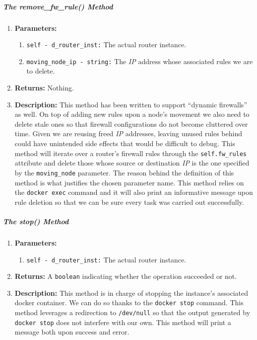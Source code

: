         \subparagraph{The remove\_fw\_rule() Method}
            \begin{enumerate}
                \item \textbf{Parameters:}
                \begin{enumerate}
                    \item \texttt{self - d\_router\_inst:} The actual router instance.
                    \item \texttt{moving\_node\_ip - string:} The \textit{IP} address whose associated rules we are to delete.
                \end{enumerate}
                \item \textbf{Returns:} Nothing.
                \item \textbf{Description:} This method has been written to support ``dynamic firewalls'' as well. On top of adding new rules upon a node's movement we also need to delete stale ones so that firewall configurations do not become cluttered over time. Given we are reusing freed \textit{IP} addresses, leaving unused rules behind could have unintended side effects that would be difficult to debug. This method will iterate over a router's firewall rules through the \texttt{self.fw\_rules} attribute and delete those whose source or destination \textit{IP} is the one specified by the \texttt{moving\_node} parameter. The reason behind the definition of this method is what justifies the chosen parameter name. This method relies on the \texttt{docker exec} command and it will also print an informative message upon rule deletion so that we can be sure every task was carried out successfully.
            \end{enumerate}

        \subparagraph{The stop() Method}
            \begin{enumerate}
                \item \textbf{Parameters:}
                \begin{enumerate}
                    \item \texttt{self - d\_router\_inst:} The actual router instance.
                \end{enumerate}
                \item \textbf{Returns:} A \texttt{boolean} indicating whether the operation succeeded or not.
                \item \textbf{Description:} This method is in charge of stopping the instance's associated docker container. We can do so thanks to the \texttt{docker stop} command. This method leverages a redirection to \texttt{/dev/null} so that the output generated by \texttt{docker stop} does not interfere with our own. This method will print a message both upon success and error.
            \end{enumerate}

